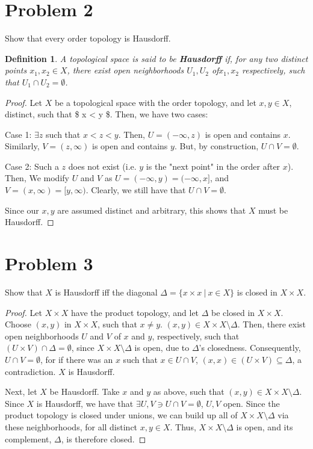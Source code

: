 \documentclass[11pt]{article}
\newtheorem{definition}{Definition}[section]
\begin{document}
\section{Problem 2}
\label{sec:org3c1e84f}
Show that every order topology is Hausdorff. 

\begin{definition}
A topological space is said to be \textbf{Hausdorff} if, for any two
distinct points \(x_1, x_2 \in X\), there exist open neighborhoods \(U_1,
U_2\) of\(x_1, x_2\) respectively, such that \(U_1\cap U_2 = \emptyset\).
\end{definition}

\begin{proof}
Let \(X\) be a topological space with the order topology, and let \(x,y
\in X\), distinct, such that \$ x < y \$. Then, we have two cases:

Case 1: \(\exists z\) such that \(x < z < y\). Then, \(U = (-\infty, z)\) is
open and contains \(x\). Similarly, \(V = (z, \infty)\) is open and
contains \(y\). But, by construction, \(U\cap V = \emptyset\). 

Case 2: Such a \(z\) does not exist (i.e. \(y\) is the "next point" in the
order after \(x\)). Then, We modify \(U\) and \(V\) as \(U = (-\infty, y) =
(-\infty, x]\), and \(V = (x, \infty) = [y, \infty)\). Clearly, we still
have that \(U\cap V = \emptyset\). 

Since our \(x,y\) are assumed distinct and arbitrary, this shows that
\(X\) must be Hausdorff. 
\end{proof}

\section{Problem 3}
\label{sec:org3acfebd}
Show that \(X\) is Hausdorff iff the diagonal \(\Delta = \{ x\times x\ |\
x \in X\}\) is closed in \(X\times X\).

\begin{proof}
Let \(X\times X\) have the product topology, and let \(\Delta\) be closed
in \(X\times X\). Choose \((x,y)\) in \(X\times X\), such that \(x \not =
y\). \((x,y) \in X\times X\setminus\Delta\). Then, there exist open
neighborhoods \(U\) and \(V\) of \(x\) and \(y\), respectively, such that
\((U\times V)\cap \Delta = \emptyset\), since \(X\times X\setminus\Delta\)
is open, due to \(\Delta\)'s closedness. Consequently, \(U\cap V =
\emptyset\), for if there was an \(x\) such that \(x \in U\cap V\), \((x,x)
\in (U\times V) \subseteq \Delta\), a contradiction. \(X\) is Hausdorff.

Next, let \(X\) be Hausdorff. Take \(x\) and \(y\) as above, such that
\((x,y) \in X\times X\setminus\Delta\). Since \(X\) is Hausdorff, we have
that \(\exists U,V \ni U\cap V = \emptyset\), \(U,V\) open. Since the
product topology is closed under unions, we can build up all of
\(X\times X\setminus\Delta\) via these neighborhoods, for all distinct
\(x,y \in X\). Thus, \(X\times X\setminus\Delta\) is open, and its
complement, \(\Delta\), is therefore closed. 
\end{proof}
\end{document}
